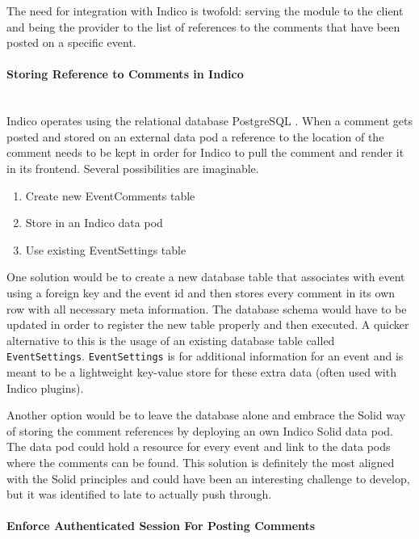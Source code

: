 The need for integration with Indico is twofold: serving the module to the client and being the provider to the list of references to the comments that have been posted on a specific event.
\vspace{0.5cm}
\paragraph{Storing Reference to Comments in Indico}\mbox{}\\

Indico operates using the relational database PostgreSQL \cite{postgresql}. When a comment gets posted and stored on an external data pod a reference to the location of the comment needs to be kept in order for Indico to pull the comment and render it in its frontend. Several possibilities are imaginable. 

\begin{enumerate}
    \item Create new EventComments table
    \item Store in an Indico data pod 
    \item Use existing EventSettings table
\end{enumerate}

One solution would be to create a new database table that associates with event using a foreign key and the event id and then stores every comment in its own row with all necessary meta information. The database schema would have to be updated in order to register the new table properly and then executed. A quicker alternative to this is the usage of an existing database table called \texttt{EventSettings}. \texttt{EventSettings} is for additional information for an event and is meant to be a lightweight key-value store for these extra data (often used with Indico plugins).

Another option would be to leave the database alone and embrace the Solid way of storing the comment references by deploying an own Indico Solid data pod. The data pod could hold a resource for every event and link to the data pods where the comments can be found. This solution is definitely the most aligned with the Solid principles and could have been an interesting challenge to develop, but it was identified to late to actually push through.
\vspace{0.5cm}
\paragraph{Enforce Authenticated Session For Posting Comments}\mbox{}\\

